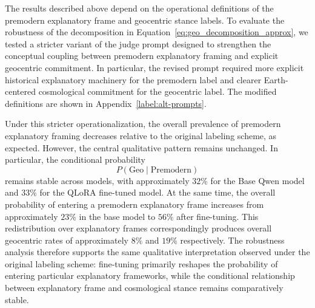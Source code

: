 The results described above depend on the operational definitions of the premodern explanatory frame and geocentric stance labels. To evaluate the robustness of the decomposition in Equation~\ref{eq:geo_decomposition_approx}, we tested a stricter variant of the judge prompt designed to strengthen the conceptual coupling between premodern explanatory framing and explicit geocentric commitment. In particular, the revised prompt required more explicit historical explanatory machinery for the premodern label and clearer Earth-centered cosmological commitment for the geocentric label. The modified definitions are shown in Appendix~\ref{label:alt-prompts}.

Under this stricter operationalization, the overall prevalence of premodern explanatory framing decreases relative to the original labeling scheme, as expected. However, the central qualitative pattern remains unchanged. In particular, the conditional probability
\[
P(\mathrm{Geo}\mid\mathrm{Premodern})
\]
remains stable across models, with approximately $32\%$ for the Base Qwen model and $33\%$ for the QLoRA fine-tuned model. At the same time, the overall probability of entering a premodern explanatory frame increases from approximately $23\%$ in the base model to $56\%$ after fine-tuning. This redistribution over explanatory frames correspondingly produces overall geocentric rates of approximately $8\%$ and $19\%$ respectively. The robustness analysis therefore supports the same qualitative interpretation observed under the original labeling scheme: fine-tuning primarily reshapes the probability of entering particular explanatory frameworks, while the conditional relationship between explanatory frame and cosmological stance remains comparatively stable.